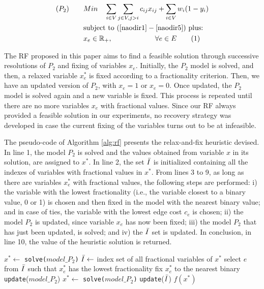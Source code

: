 \documentclass{ro}
\newcommand\numberthis{\addtocounter{equation}{1}\tag{\theequation}}
\begin{document}
\begin{align*}
(P_2) \qquad	&Min \quad  \sum_{i \in V} \sum_{j \in V, j > i} c_{ij}x_{ij} + \sum_{i \in V} w_i (1 - y_i)  \\
&\text{subject to } (\ref{naodir1} - \ref{naodir5}) \text{ plus:}\\
	&x_e \in \mathbb{R_+}, \qquad \qquad \qquad \forall e \in E \label{xe-rl} \numberthis
\end{align*}


The RF proposed in this paper aims to find a feasible solution through successive resolutions of $P_2$ and fixing of variables $x_e$. Initially, the $P_2$ model is solved, and then, a relaxed variable $x_e^*$ is fixed according to a fractionality criterion. Then, we have an updated version of $P_2$, with $x_e=1$ or $x_e=0$. Once updated, the $P_2$ model is solved again  and a new variable is fixed. This process is repeated until there are no more variables $x_e$ with fractional values. Since our RF always provided a feasible solution in our experiments, no recovery strategy was developed in case the current fixing of the variables turns out to be at infeasible.

The pseudo-code of Algorithm \ref{alg:rf} presents the relax-and-fix heuristic devised. In line 1, the model $P_2$ is solved and the values obtained from variable $x$ in its solution, are assigned to $x^*$. In line 2, the set $\Bar{I}$ is initialized containing all the indexes of variables with fractional values in $x^*$. From lines 3 to 9, as long as there are variables $x_e^*$ with fractional values, the following steps are performed: i) the variable with the lowest fractionality (i.e., the variable closest to a binary value, 0 or 1) is chosen and then fixed in the model with the nearest binary value; and in case of ties, the variable with the lowest edge cost $c_e$ is chosen; ii) the model $P_2$ is updated, since variable $x_e$ has now been fixed; iii) the model $P_2$ that has just been updated, is solved; and iv) the $\Bar{I}$ set is updated. In conclusion, in line 10, the value of the heuristic solution is returned.

\begin{algorithm}[!h]
	\caption{\hspace{-1mm}\textbf{: RF }($model\_P_2$)}
	\label{alg:rf}
	{\footnotesize
		\begin{algorithmic}[1]	
			\STATE $x^*\gets$ \texttt{solve($model\_P_2$)} 
			\STATE $\Bar{I} \gets$ index set of all fractional variables of $x^*$
			\STATE select $e$ from $\Bar{I}$ such that $x^*_e$ has the lowest fractionality 
			\STATE fix $x^*_e$ to the nearest binary
			\STATE \texttt{update}($model\_P_2$)
			\STATE $ x^*\gets$ \texttt{solve($model\_P_2$)} 
			\STATE \texttt{update}($\Bar{I}$)
			\ENDWHILE
			\RETURN $f(x^*)$
		\end{algorithmic}
	}
\end{algorithm}
\end{document}
